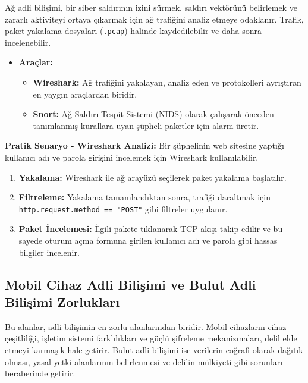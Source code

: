 \begin{itemize}
Ağ adli bilişimi, bir siber saldırının izini sürmek, saldırı vektörünü belirlemek ve zararlı aktiviteyi ortaya çıkarmak için ağ trafiğini analiz etmeye odaklanır. Trafik, paket yakalama dosyaları (\texttt{.pcap}) halinde kaydedilebilir ve daha sonra incelenebilir.

\begin{itemize}
    \item \textbf{Araçlar:}
    \begin{itemize}
        \item \textbf{Wireshark:} Ağ trafiğini yakalayan, analiz eden ve protokolleri ayrıştıran en yaygın araçlardan biridir.
        \item \textbf{Snort:} Ağ Saldırı Tespit Sistemi (NIDS) olarak çalışarak önceden tanımlanmış kurallara uyan şüpheli paketler için alarm üretir.
    \end{itemize}
\end{itemize}
\textbf{Pratik Senaryo - Wireshark Analizi:}
Bir şüphelinin web sitesine yaptığı kullanıcı adı ve parola girişini incelemek için Wireshark kullanılabilir.
\begin{enumerate}
    \item \textbf{Yakalama:} Wireshark ile ağ arayüzü seçilerek paket yakalama başlatılır.
    \item \textbf{Filtreleme:} Yakalama tamamlandıktan sonra, trafiği daraltmak için \texttt{http.request.method == "POST"} gibi filtreler uygulanır.
    \item \textbf{Paket İncelemesi:} İlgili pakete tıklanarak TCP akışı takip edilir ve bu sayede oturum açma formuna girilen kullanıcı adı ve parola gibi hassas bilgiler incelenir.
\end{enumerate}

\subsection{Mobil Cihaz Adli Bilişimi ve Bulut Adli Bilişimi Zorlukları}

Bu alanlar, adli bilişimin en zorlu alanlarından biridir. Mobil cihazların cihaz çeşitliliği, işletim sistemi farklılıkları ve güçlü şifreleme mekanizmaları, delil elde etmeyi karmaşık hale getirir. Bulut adli bilişimi ise verilerin coğrafi olarak dağıtık olması, yasal yetki alanlarının belirlenmesi ve delilin mülkiyeti gibi sorunları beraberinde getirir.


\end{itemize}
